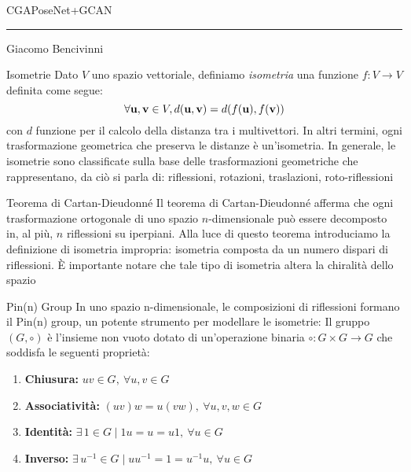 \begin{frame}
    \Huge CGAPoseNet+GCAN
    \rule{\textwidth}{.25pt}
    \small{Giacomo Bencivinni}
\end{frame}
\begin{frame}{Isometrie}
    Dato \(V\) uno spazio vettoriale, 
    definiamo \emph{isometria} una funzione \(f \colon V \to V\) definita come segue:
    \[
        \forall \mathbf{u}, \mathbf{v} \in V, d(\mathbf{u}, \mathbf{v}) = d(f(\mathbf{u}), f(\mathbf{v}))
    \]
    con \(d\) funzione per il calcolo della distanza tra i multivettori.
    In altri termini, ogni trasformazione geometrica che preserva le distanze
    è un'isometria. In generale,
    le isometrie sono classificate sulla base delle trasformazioni geometriche che rappresentano,
    da ciò si parla di: riflessioni, rotazioni, traslazioni, roto-riflessioni
\end{frame}

\begin{frame}{Teorema di Cartan-Dieudonné}
   Il teorema di Cartan-Dieudonné afferma che ogni trasformazione ortogonale
   di uno spazio \(n\)-dimensionale può essere decomposto in, al più, 
   \(n\) riflessioni su iperpiani.
   Alla luce di questo teorema introduciamo la definizione di isometria impropria: 
   isometria composta da un numero dispari di riflessioni. 
   È importante notare che tale tipo di isometria altera la chiralità dello spazio
\end{frame}

\begin{frame}{Pin(n) Group}
   In uno spazio n-dimensionale, le composizioni di riflessioni formano il Pin(n) group, un potente strumento per modellare le isometrie:
   Il gruppo \((G, \circ)\) è l’insieme non vuoto dotato di un'operazione binaria \(\circ : G \times G \to G\) che soddisfa le seguenti proprietà:
   
   \begin{enumerate}
      \item \textbf{Chiusura:} \( uv \in G, \ \forall u, v \in G \)
      \item \textbf{Associatività:} \( (uv)w = u(vw), \ \forall u, v, w \in G \)
      \item \textbf{Identità:} \( \exists \, 1 \in G \mid 1u = u = u1, \ \forall u \in G \)
      \item \textbf{Inverso:} \( \exists \, u^{-1} \in G \mid uu^{-1} = 1 = u^{-1}u, \ \forall u \in G \)
    \end{enumerate}
\end{frame}

